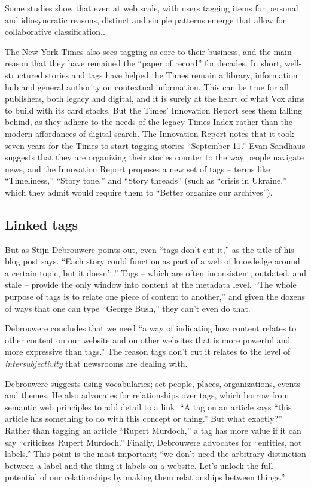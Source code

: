 Some studies show that even at web scale, with users tagging items for personal and idiosyncratic reasons, distinct and simple patterns emerge that allow for collaborative classification.\autocite{catutto_semiotic_dynamics}.

The New York Times also sees tagging as core to their business, and the main reason that they have remained the ``paper of record'' for decades. In short, well-structured stories and tags have helped the Times remain a library, information hub and general authority on contextual information. This can be true for all publishers, both legacy and digital, and it is surely at the heart of what Vox aims to build with its card stacks. But the Times' Innovation Report sees them falling behind, as they adhere to the needs of the legacy Times Index rather than the modern affordances of digital search. The Innovation Report notes that it took seven years for the Times to start tagging stories ``September 11.'' Evan Sandhaus suggests that they are organizing their stories counter to the way people navigate news, and the Innovation Report proposes a new set of tags -- terms like ``Timeliness,'' ``Story tone,'' and ``Story threads'' (such as ``crisis in Ukraine,'' which they admit would require them to ``Better organize our archives'').

\subsection{Linked tags}

But as Stijn Debrouwere points out, even ``tags don't cut it,'' as the title of his blog post says. ``Each story could function as part of a web of knowledge around a certain topic, but it doesn't.'' Tags -- which are often inconsistent, outdated, and stale -- provide the only window into content at the metadata level. ``The whole purpose of tags is to relate one piece of content to another,'' and given the dozens of ways that one can type ``George Bush,'' they can't even do that.

Debrouwere concludes that we need ``a way of indicating how content relates to other content on our website and on other websites that is more powerful and more expressive than tags.'' The reason tags don't cut it relates to the level of \emph{intersubjectivity} that newsrooms are dealing with.

Debrouwere suggests using vocabularies; set people, places, organizations, events and themes. He also advocates for relationships over tags, which borrow from semantic web principles to add detail to a link. ``A tag on an article says ``this article has something to do with this concept or thing.'' But what exactly?'' Rather than tagging an article ``Rupert Murdoch,'' a tag has more value if it can say ``criticizes Rupert Murdoch.'' Finally, Debrouwere advocates for ``entities, not labels.'' This point is the most important; ``we don't need the arbitrary distinction between a label and the thing it labels on a website. Let's unlock the full potential of our relationships by making them relationships between things.''

